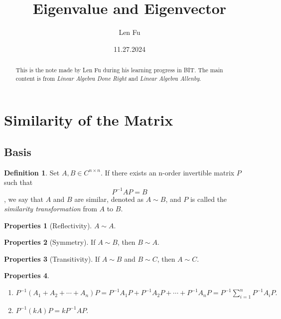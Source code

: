 \documentclass{article}
\title{Eigenvalue and Eigenvector}
\author{Len Fu}
\date{11.27.2024}
\theoremstyle{definition}
\newtheorem{defi}{Definition}[section]
\newtheorem{pro}{Properties}[section]
\begin{document}
\maketitle

\begin{abstract}
    This is the note made by Len Fu during his learning progress in BIT.
    The main content is from \textit{Linear Algebra Done Right} and \textit{Linear Algebra Allenby}.
\end{abstract}

\tableofcontents

\newpage

\section{Similarity of the Matrix}
\subsection{Basis}
\begin{defi}
    Set $A,B\in C^{n\times n}$. If there exists
    an n-order invertible matrix $P$ such that 
    $$P^{-1}AP=B$$, we say that $A$ and $B$ are similar,
    denoted as $A\sim B$, and $P$ is called the 
    \textit{similarity transformation} from $A$ to $B$. 
\end{defi}

\begin{pro}[Reflectivity]
    $A\sim A$.
\end{pro}

\begin{pro}[Symmetry]
    If $A\sim B$, then $B\sim A$.
\end{pro}

\begin{pro}[Transitivity]
    If $A\sim B$ and $B\sim C$, then $A\sim C$.
\end{pro}



\begin{pro}
\begin{enumerate}
\item $P^{-1}(A_{1}+A_{2}+\cdots+A_{n})P=P^{-1}A_{1}P+P^{-1}A_{2}P+\cdots+P^{-1}A_{n}P=P^{-1}\sum_{i=1}^{n}P^{-1}A_{i}P.$
\item $P^{-1}(kA)P=kP^{-1}AP.$
\end{enumerate}

\end{pro}
\end{document}
